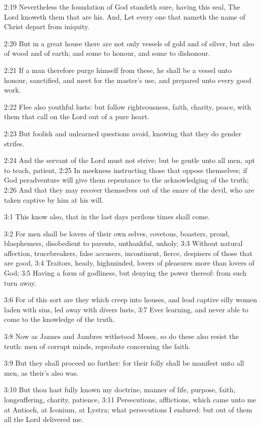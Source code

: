 2:19 Nevertheless the foundation of God standeth sure, having this
seal, The Lord knoweth them that are his. And, Let every one that
nameth the name of Christ depart from iniquity.

2:20 But in a great house there are not only vessels of gold and of
silver, but also of wood and of earth; and some to honour, and some to
dishonour.

2:21 If a man therefore purge himself from these, he shall be a vessel
unto honour, sanctified, and meet for the master's use, and prepared
unto every good work.

2:22 Flee also youthful lusts: but follow righteousness, faith,
charity, peace, with them that call on the Lord out of a pure heart.

2:23 But foolish and unlearned questions avoid, knowing that they do
gender strifes.

2:24 And the servant of the Lord must not strive; but be gentle unto
all men, apt to teach, patient, 2:25 In meekness instructing those
that oppose themselves; if God peradventure will give them repentance
to the acknowledging of the truth; 2:26 And that they may recover
themselves out of the snare of the devil, who are taken captive by him
at his will.

3:1 This know also, that in the last days perilous times shall come.

3:2 For men shall be lovers of their own selves, covetous, boasters,
proud, blasphemers, disobedient to parents, unthankful, unholy, 3:3
Without natural affection, trucebreakers, false accusers, incontinent,
fierce, despisers of those that are good, 3:4 Traitors, heady,
highminded, lovers of pleasures more than lovers of God; 3:5 Having a
form of godliness, but denying the power thereof: from such turn away.

3:6 For of this sort are they which creep into houses, and lead
captive silly women laden with sins, led away with divers lusts, 3:7
Ever learning, and never able to come to the knowledge of the truth.

3:8 Now as Jannes and Jambres withstood Moses, so do these also resist
the truth: men of corrupt minds, reprobate concerning the faith.

3:9 But they shall proceed no further: for their folly shall be
manifest unto all men, as their's also was.

3:10 But thou hast fully known my doctrine, manner of life, purpose,
faith, longsuffering, charity, patience, 3:11 Persecutions,
afflictions, which came unto me at Antioch, at Iconium, at Lystra;
what persecutions I endured: but out of them all the Lord delivered
me.

